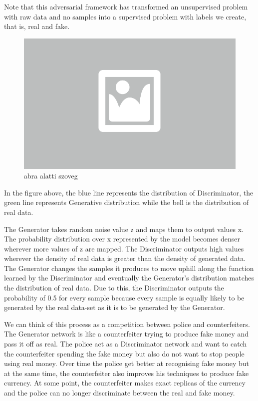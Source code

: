 Note that this adversarial framework has transformed an unsupervised problem with raw data and no samples into a supervised problem with labels we create, that is, real and fake. 

\begin{figure}[ht]
	\centering
	\includegraphics[width=0.65\columnwidth]{figures/abra.png}
	\caption{abra alatti szoveg}
\end{figure}

In the figure above, the blue line represents the distribution of Discriminator, the green line represents Generative distribution while the bell is the distribution of real data.

The Generator takes random noise value z and maps them to output values x. The probability distribution over x represented by the model becomes denser wherever more values of z are mapped. The Discriminator outputs high values wherever the density of real data is greater than the density of generated data. The Generator changes the samples it produces to move uphill along the function learned by the Discriminator and eventually the Generator’s distribution matches the distribution of real data. Due to this, the Discriminator outputs the probability of 0.5 for every sample because every sample is equally likely to be generated by the real data-set as it is to be generated by the Generator.

We can think of this process as a competition between police and counterfeiters. The Generator network is like a counterfeiter trying to produce fake money and pass it off as real. The police act as a Discriminator network and want to catch the counterfeiter spending the fake money but also do not want to stop people using real money. Over time the police get better at recognising fake money but at the same time, the counterfeiter also improves his techniques to produce fake currency. At some point, the counterfeiter makes exact replicas of the currency and the police can no longer discriminate between the real and fake money.

